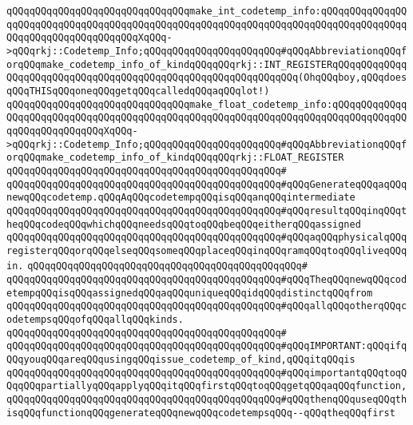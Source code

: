 \verb|qQQqqQQqqQQqqQQqqQQqqQQqqQQqqQQqmake_int_codetemp_info:qQQqqQQqqQQqqQQqqQQqqQQqqQQqqQQqqQQqqQQqqQQqqQQqqQQqqQQqqQQqqQQqqQQqqQQqqQQqqQQqqQQqqQQqqQQqqQQqqQQqqQQqqQQqXqQQq->qQQqrkj::Codetemp_Info;qQQqqQQqqQQqqQQqqQQqqQQq#qQQqAbbreviationqQQqforqQQqmake_codetemp_info_of_kindqQQqqQQqrkj::INT_REGISTERqQQqqQQqqQQqqQQqqQQqqQQqqQQqqQQqqQQqqQQqqQQqqQQqqQQqqQQqqQQqqQQq(OhqQQqboy,qQQqdoesqQQqTHISqQQqoneqQQqgetqQQqcalledqQQqaqQQqlot!)|\newline
\verb|qQQqqQQqqQQqqQQqqQQqqQQqqQQqqQQqmake_float_codetemp_info:qQQqqQQqqQQqqQQqqQQqqQQqqQQqqQQqqQQqqQQqqQQqqQQqqQQqqQQqqQQqqQQqqQQqqQQqqQQqqQQqqQQqqQQqqQQqqQQqqQQqXqQQq->qQQqrkj::Codetemp_Info;qQQqqQQqqQQqqQQqqQQqqQQq#qQQqAbbreviationqQQqforqQQqmake_codetemp_info_of_kindqQQqqQQqrkj::FLOAT_REGISTER|\newline
\verb|qQQqqQQqqQQqqQQqqQQqqQQqqQQqqQQqqQQqqQQqqQQqqQQq#|\newline
\verb|qQQqqQQqqQQqqQQqqQQqqQQqqQQqqQQqqQQqqQQqqQQqqQQq#qQQqGenerateqQQqaqQQqnewqQQqcodetemp.qQQqAqQQqcodetempqQQqisqQQqanqQQqintermediate|\newline
\verb|qQQqqQQqqQQqqQQqqQQqqQQqqQQqqQQqqQQqqQQqqQQqqQQq#qQQqresultqQQqinqQQqtheqQQqcodeqQQqwhichqQQqneedsqQQqtoqQQqbeqQQqeitherqQQqassigned|\newline
\verb|qQQqqQQqqQQqqQQqqQQqqQQqqQQqqQQqqQQqqQQqqQQqqQQq#qQQqaqQQqphysicalqQQqregisterqQQqorqQQqelseqQQqsomeqQQqplaceqQQqinqQQqramqQQqtoqQQqliveqQQqin.|\newline
\verb|qQQqqQQqqQQqqQQqqQQqqQQqqQQqqQQqqQQqqQQqqQQqqQQq#|\newline
\verb|qQQqqQQqqQQqqQQqqQQqqQQqqQQqqQQqqQQqqQQqqQQqqQQq#qQQqTheqQQqnewqQQqcodetempqQQqisqQQqassignedqQQqaqQQquniqueqQQqidqQQqdistinctqQQqfrom|\newline
\verb|qQQqqQQqqQQqqQQqqQQqqQQqqQQqqQQqqQQqqQQqqQQqqQQq#qQQqallqQQqotherqQQqcodetempsqQQqofqQQqallqQQqkinds.|\newline
\verb|qQQqqQQqqQQqqQQqqQQqqQQqqQQqqQQqqQQqqQQqqQQqqQQq#|\newline
\verb|qQQqqQQqqQQqqQQqqQQqqQQqqQQqqQQqqQQqqQQqqQQqqQQq#qQQqIMPORTANT:qQQqifqQQqyouqQQqareqQQqusingqQQqissue_codetemp_of_kind,qQQqitqQQqis|\newline
\verb|qQQqqQQqqQQqqQQqqQQqqQQqqQQqqQQqqQQqqQQqqQQqqQQq#qQQqimportantqQQqtoqQQqqQQqpartiallyqQQqapplyqQQqitqQQqfirstqQQqtoqQQqgetqQQqaqQQqfunction,|\newline
\verb|qQQqqQQqqQQqqQQqqQQqqQQqqQQqqQQqqQQqqQQqqQQqqQQq#qQQqthenqQQquseqQQqthisqQQqfunctionqQQqgenerateqQQqnewqQQqcodetempsqQQq--qQQqtheqQQqfirst|\newline
